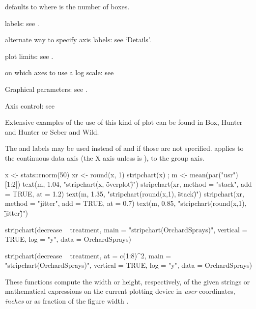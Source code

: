 \begin{Arguments}
\begin{ldescription}
defaults to  where  is the number of boxes.
\item[\code{ylab, xlab}] labels: see .
\item[\code{dlab, glab}] alternate way to specify axis labels: see `Details'.
\item[\code{xlim, ylim}] plot limits: see .
\item[\code{log}] on which axes to use a log scale:  see 
\item[\code{pch, col, cex}] Graphical parameters: see .
\item[\code{axes, frame.plot}] Axis control:  see 
\end{ldescription}
\end{Arguments}
%
\begin{Details}\relax
Extensive examples of the use of this kind of plot can be found in
Box, Hunter and Hunter or Seber and Wild.

The  and  labels may be used instead of 
and  if those are not specified.   applies to the 
continuous data axis (the X axis unless  is ),
 to the group axis.
\end{Details}
%
\begin{Examples}
\begin{ExampleCode}
x <- stats::rnorm(50)
xr <- round(x, 1)
stripchart(x) ; m <- mean(par("usr")[1:2])
text(m, 1.04, "stripchart(x, \"overplot\")")
stripchart(xr, method = "stack", add = TRUE, at = 1.2)
text(m, 1.35, "stripchart(round(x,1), \"stack\")")
stripchart(xr, method = "jitter", add = TRUE, at = 0.7)
text(m, 0.85, "stripchart(round(x,1), \"jitter\")")

stripchart(decrease ~ treatment,
    main = "stripchart(OrchardSprays)", 
    vertical = TRUE, log = "y", data = OrchardSprays)

stripchart(decrease ~ treatment, at = c(1:8)^2,
    main = "stripchart(OrchardSprays)", 
    vertical = TRUE, log = "y", data = OrchardSprays)
\end{ExampleCode}
\end{Examples}
%
\begin{Description}\relax
These functions compute the width or height, respectively, of the
given strings or mathematical expressions  on
the current plotting device in \emph{user} coordinates, \emph{inches}
or as fraction of the figure width .
\end{Description}
